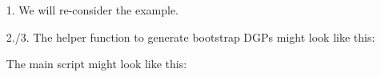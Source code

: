\begin{enumerate}

\item[1.] We will re-consider the \textcite{Rubio-Ramirez.Waggoner.Zha_2010_StructuralVectorAutoregressions} example.

\item[2./3.]  The helper function to generate bootstrap DGPs might look like this:

The main script might look like this:

\end{enumerate}

